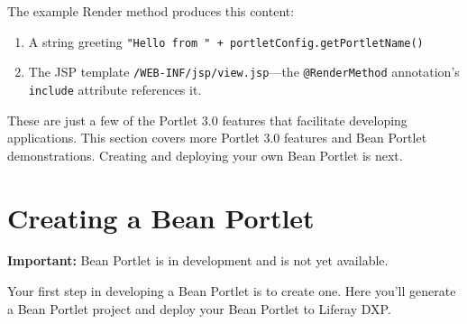 The example Render method produces this content:

\begin{enumerate}
\def\labelenumi{\arabic{enumi}.}
\item
  A string greeting
  \texttt{"Hello\ from\ "\ +\ portletConfig.getPortletName()}
\item
  The JSP template \texttt{/WEB-INF/jsp/view.jsp}---the
  \texttt{@RenderMethod} annotation's \texttt{include} attribute
  references it.
\end{enumerate}

These are just a few of the Portlet 3.0 features that facilitate
developing applications. This section covers more Portlet 3.0 features
and Bean Portlet demonstrations. Creating and deploying your own Bean
Portlet is next.

\chapter{Creating a Bean Portlet}\label{creating-a-bean-portlet}

\noindent\hrulefill

\textbf{Important:} Bean Portlet is in development and is not yet
available.

\noindent\hrulefill

Your first step in developing a Bean Portlet is to create one. Here
you'll generate a Bean Portlet project and deploy your Bean Portlet to
Liferay DXP.

